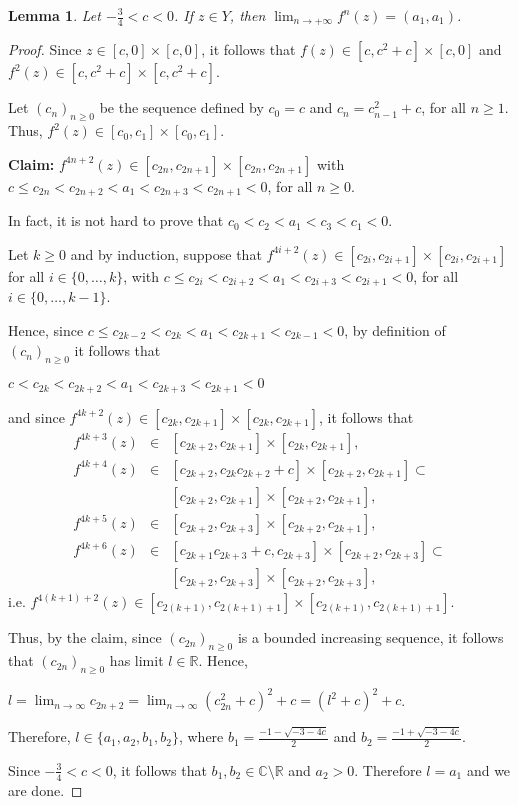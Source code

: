 \documentclass[11pt]{amsart}
\newtheorem{lemma}[theorem]{Lemma}
\theoremstyle{definition}
\begin{document}
\begin{lemma}
	Let $-\frac{3}{4}< c<0$. If $z\in Y$, then $\displaystyle\lim_{n\to+\infty}f^n(z)=(a_1,a_1)$. \label{lemaazia}
\end{lemma}
\begin{proof}
	Since $z\in[c,0]\times[c,0]$, it follows that $f(z)\in [c,c^2+c]\times [c,0]$ and $f^2(z)\in [c,c^2+c]\times [c,c^2+c]$.
	
	Let $(c_n)_{n\geq 0}$ be the sequence defined by $c_0=c$ and $c_n=c_{n-1}^2+c$, for all $n\geq 1$. Thus, $f^2(z)\in [c_0,c_1]\times[c_0,c_1]$.
	
\noindent \textbf{Claim:} $f^{4n+2}(z)\in [c_{2n},c_{2n+1}]\times[c_{2n},c_{2n+1}]$ with $c\leq c_{2n}<c_{2n+2}<a_1<c_{2n+3}<c_{2n+1}<0$, for all $n\geq 0$.

 In fact, it is not hard to prove that $c_0<c_2<a_1<c_3<c_1<0$.
	
Let $k\geq 0$ and by induction, suppose that  $f^{4i+2}(z)\in [c_{2i},c_{2i+1}]\times[c_{2i},c_{2i+1}]$ for all $i\in\{0,\ldots, k\}$, with $c\leq c_{2i}<c_{2i+2}<a_1<c_{2i+3}<c_{2i+1}<0$, for all $i\in\{0,\ldots, k-1\}$.
	
	Hence, since $c\leq c_{2k-2}<c_{2k}<a_1<c_{2k+1}<c_{2k-1}< 0$, by definition of $(c_n)_{n\geq 0}$ it follows that
\begin{center}	
$c<c_{2k}<c_{2k+2}<a_1<c_{2k+3}<c_{2k+1}< 0$
\end{center}
 and since $f^{4k+2}(z)\in [c_{2k},c_{2k+1}]\times[c_{2k},c_{2k+1}]$, it follows that
	$$
	\begin{array}{rcl}
	f^{4k+3}(z) & \in & [c_{2k+2},c_{2k+1}]\times[c_{2k},c_{2k+1}] \textrm{, } \\
	f^{4k+4}(z) & \in & [c_{2k+2},c_{2k}c_{2k+2}+c]\times[c_{2k+2},c_{2k+1}]\subset \\
	            &     & [c_{2k+2},c_{2k+1}]\times[c_{2k+2},c_{2k+1}] \textrm{, }  \\
	f^{4k+5}(z) & \in & [c_{2k+2},c_{2k+3}]\times[c_{2k+2},c_{2k+1}] \textrm{, } \\
	f^{4k+6}(z) & \in & [c_{2k+1}c_{2k+3}+c,c_{2k+3}]\times[c_{2k+2},c_{2k+3}]\subset \\
	            &     & [c_{2k+2},c_{2k+3}]\times[c_{2k+2},c_{2k+3}]\textrm{, }
	\end{array}
	$$
	\noindent i.e. $f^{4(k+1)+2}(z)\in [c_{2(k+1)},c_{2(k+1)+1}]\times[c_{2(k+1)},c_{2(k+1)+1}]$.
	
	Thus, by the claim, since $(c_{2n})_{n\geq 0}$ is a bounded increasing sequence, it follows that $(c_{2n})_{n\geq 0}$ has limit $l\in\mathbb{R}$. Hence,
	
	\begin{center}
		$\displaystyle l=\lim_{n\to\infty}c_{2n+2}=\lim_{n\to\infty}(c_{2n}^2+c)^2+c=(l^2+c)^2+c$.
	\end{center}
	Therefore, $l\in\{a_1,a_2,b_1,b_2\}$, where $b_1=\frac{-1-\sqrt{-3-4c}}{2}$ and $b_2=\frac{-1+\sqrt{-3-4c}}{2}$.
	
	Since $-\frac{3}{4}<c<0$, it follows that $b_1,b_2\in\mathbb{C}\setminus\mathbb{R}$ and $a_2>0$. Therefore $l=a_1$ and we are done.
\end{proof}
\end{document}
